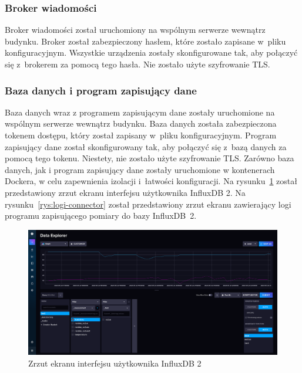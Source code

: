 \subsubsection{Broker wiadomości}
Broker wiadomości został uruchomiony na wspólnym serwerze wewnątrz budynku.
Broker został zabezpieczony hasłem, które zostało zapisane w~pliku konfiguracyjnym.
Wszystkie urządzenia zostały skonfigurowane tak, aby połączyć się z~brokerem za pomocą tego hasła.
Nie zostało użyte szyfrowanie TLS.

\subsubsection{Baza danych i program zapisujący dane}
Baza danych wraz z programem zapisującym dane zostały uruchomione na wspólnym serwerze wewnątrz budynku.
Baza danych została zabezpieczona tokenem dostępu, który został zapisany w~pliku konfiguracyjnym.
Program zapisujący dane został skonfigurowany tak, aby połączyć się z~bazą danych za pomocą tego tokenu.
Niestety, nie zostało użyte szyfrowanie TLS.
Zarówno baza danych, jak i program zapisujący dane zostały uruchomione w kontenerach Dockera, w celu zapewnienia izolacji i~łatwości konfiguracji.
Na rysunku~\ref{rys:influxdb-web} został przedstawiony zrzut ekranu interfejsu użytkownika InfluxDB 2.
Na rysunku~\ref{rys:logi-connector} został przedstawiony zrzut ekranu zawierający logi programu zapisującego pomiary do bazy InfluxDB~2.

\begin{figure}[b!]
    \begin{center}
        \includegraphics[width=13cm]{pic/influxdb-web.png}
    \end{center}
    \caption{Zrzut ekranu interfejsu użytkownika InfluxDB 2}\label{rys:influxdb-web}
\end{figure}

